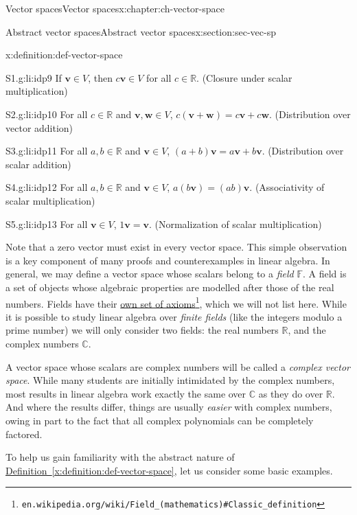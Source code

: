 \documentclass[oneside,10pt,]{book}
\newcommand{\xreffont}{\relax}
\numberwithin{equation}{section}
\newcommand{\R}{\mathbb{R}}
\newcommand{\C}{\mathbb{C}}
\newcommand{\vv}{\mathbf{v}}
\newcommand{\ww}{\mathbf{w}}
\begin{document}
\begin{chapterptx}{Vector spaces}{}{Vector spaces}{}{}{x:chapter:ch-vector-space}
\begin{sectionptx}{Abstract vector spaces}{}{Abstract vector spaces}{}{}{x:section:sec-vec-sp}
\begin{definition}{}{x:definition:def-vector-space}
\begin{descriptionlist}
\begin{dlimedium}{S1.}{g:li:idp9}
If \(\vv\in V\), then \(c\vv\in V\) for all \(c\in\R\). (Closure under scalar multiplication)%
\end{dlimedium}%
\begin{dlimedium}{S2.}{g:li:idp10}%
For all \(c\in \R\) and \(\vv,\ww\in V\), \(c(\vv+\ww)=c\vv+c\ww\). (Distribution over vector addition)%
\end{dlimedium}%
\begin{dlimedium}{S3.}{g:li:idp11}%
For all \(a,b\in\R\) and \(\vv\in V\), \((a+b)\vv=a\vv+b\vv\). (Distribution over scalar addition)%
\end{dlimedium}%
\begin{dlimedium}{S4.}{g:li:idp12}%
For all \(a,b\in \R\) and \(\vv\in V\), \(a(b\vv)=(ab)\vv\). (Associativity of scalar multiplication)%
\end{dlimedium}%
\begin{dlimedium}{S5.}{g:li:idp13}%
For all \(\vv\in V\), \(1\vv=\vv\). (Normalization of scalar multiplication)%
\end{dlimedium}%
\end{descriptionlist}
%
\end{definition}
Note that a zero vector must exist in every vector space. This simple observation is a key component of many proofs and counterexamples in linear algebra. In general, we may define a vector space whose scalars belong to a \emph{field} \(\mathbb{F}\). A field is a set of objects whose algebraic properties are modelled after those of the real numbers. Fields have their \href{https://en.wikipedia.org/wiki/Field_(mathematics)\#Classic_definition}{own set of axioms}\footnote{\nolinkurl{en.wikipedia.org/wiki/Field_(mathematics)\#Classic_definition}\label{g:fn:idp14}}, which we will not list here. While it is possible to study linear algebra over \emph{finite fields} (like the integers modulo a prime number) we will only consider two fields: the real numbers \(\R\), and the complex numbers \(\C\).%
\par
A vector space whose scalars are complex numbers will be called a \emph{complex vector space}. While many students are initially intimidated by the complex numbers, most results in linear algebra work exactly the same over \(\C\) as they do over \(\R\). And where the results differ, things are usually \emph{easier} with complex numbers, owing in part to the fact that all complex polynomials can be completely factored.%
\par
To help us gain familiarity with the abstract nature of \hyperref[x:definition:def-vector-space]{Definition~{\xreffont\ref{x:definition:def-vector-space}}}, let us consider some basic examples.%

\end{sectionptx}
\end{chapterptx}
\end{document}
